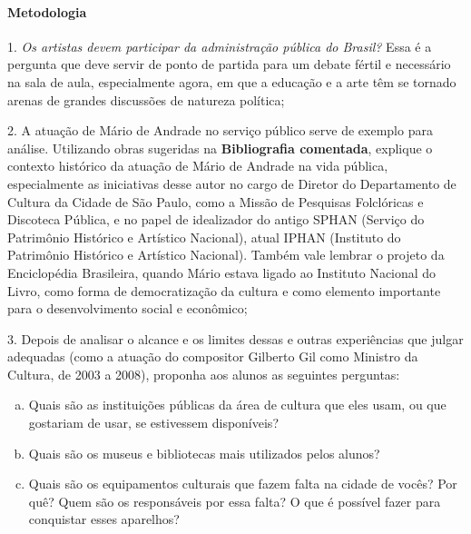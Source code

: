\documentclass[11pt]{extarticle}
\begin{document}
\paragraph{Metodologia}

1. \textit{Os artistas devem participar da administração pública do Brasil?} Essa
é a pergunta que deve servir de ponto de partida para um debate fértil e
necessário na sala de aula, especialmente agora, em que a educação e a
arte têm se tornado arenas de grandes discussões de natureza política;

\vspace{3mm}

2. A atuação de Mário de Andrade no serviço público serve de exemplo
para análise. Utilizando obras sugeridas na \textbf{Bibliografia
comentada}, explique o contexto histórico da atuação de Mário de Andrade
na vida pública, especialmente as iniciativas desse autor no cargo de
Diretor do Departamento de Cultura da Cidade de São Paulo, como a Missão
de Pesquisas Folclóricas e Discoteca Pública, e no papel de idealizador
do antigo SPHAN (Serviço do Patrimônio Histórico e Artístico Nacional),
atual IPHAN (Instituto do Patrimônio Histórico e Artístico Nacional).
Também vale lembrar o projeto da Enciclopédia Brasileira, quando Mário
estava ligado ao Instituto Nacional do Livro, como forma de
democratização da cultura e como elemento importante para o
desenvolvimento social e econômico;

\vspace{3mm}

3. Depois de analisar o alcance e os limites dessas e outras
experiências que julgar adequadas (como a atuação do compositor Gilberto
Gil como Ministro da Cultura, de 2003 a 2008), proponha aos alunos as
seguintes perguntas:

\begin{enumerate}[(a)]  

\item Quais são as instituições públicas da área de cultura que eles usam,
ou que gostariam de usar, se estivessem disponíveis?

\item Quais são os museus e bibliotecas mais utilizados pelos alunos?

\item Quais são os equipamentos culturais que fazem falta na cidade de
vocês? Por quê? Quem são os responsáveis por essa falta? O que é
possível fazer para conquistar esses aparelhos?

\end{enumerate} 
\end{document}
